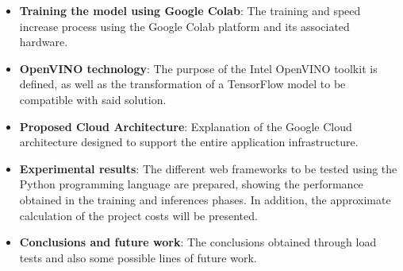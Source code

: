 \begin{itemize}
    \item\textbf{Training the model using Google Colab}: The training and speed increase process using the Google Colab platform and its associated hardware.
    \item\textbf{OpenVINO technology}: The purpose of the Intel OpenVINO toolkit is defined, as well as the transformation of a TensorFlow model to be compatible with said solution.
    \item\textbf{Proposed Cloud Architecture}: Explanation of the Google Cloud architecture designed to support the entire application infrastructure.
    \item\textbf {Experimental results}: The different web frameworks to be tested using the Python programming language are prepared, showing the performance obtained in the training and inferences phases. In addition, the approximate calculation of the project costs will be presented.
    \item\textbf{Conclusions and future work}: The conclusions obtained through load tests and also some possible lines of future work.
\end{itemize}

